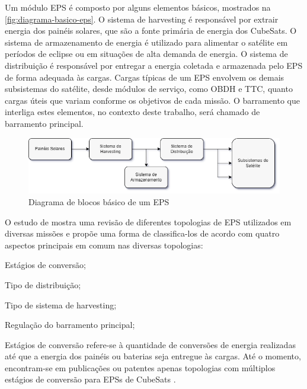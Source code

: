Um módulo \gls{EPS} é composto por alguns elementos básicos, mostrados na \autoref{fig:diagrama-basico-eps}.
O sistema de harvesting é responsável por extrair energia dos painéis solares, que são a fonte primária de energia dos CubeSats.
O sistema de armazenamento de energia é utilizado para alimentar o satélite em períodos de eclipse ou em situações de alta demanda de energia.
O sistema de distribuição é responsável por entregar a energia coletada e armazenada pelo \gls{EPS} de forma adequada às cargas.
Cargas típicas de um \gls{EPS} envolvem os demais subsistemas do satélite, desde módulos de serviço, como \gls{OBDH} e \gls{TTC}, quanto cargas úteis que variam conforme os objetivos de cada missão.
O barramento que interliga estes elementos, no contexto deste trabalho, será chamado de barramento principal.

\begin{figure}[htp]
    \caption{Diagrama de blocos básico de um \gls{EPS}}
    \begin{center}
        \includegraphics[width=\textwidth, keepaspectratio]{images/basic-eps-block-diagram.png}
    \end{center}
    \label{fig:diagrama-basico-eps}
\end{figure}


O estudo de \textcite{comprehensive-review-eps} mostra uma revisão de diferentes topologias de \gls{EPS} utilizados em diversas missões e propõe uma forma de classifica-los de acordo com quatro aspectos principais em comum nas diversas topologias:
\begin{alineas}
    \item Estágios de conversão;
    \item Tipo de distribuição; %
    \item Tipo de sistema de harvesting;%
    \item Regulação do barramento principal;%
\end{alineas}

Estágios de conversão refere-se à quantidade de conversões de energia realizadas até que a energia dos painéis ou baterias seja entregue às cargas. Até o momento, encontram-se em publicações ou patentes apenas topologias com múltiplos estágios de conversão para \gls{EPS}s de CubeSats \cite{comprehensive-review-eps}.

